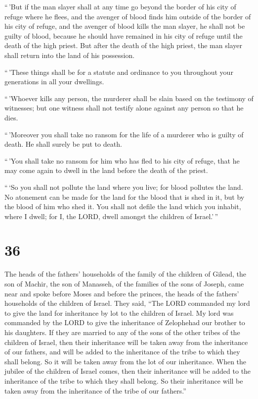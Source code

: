  ``\,'But if the man slayer shall at any time go beyond
the border of his city of refuge where he flees,  and the
avenger of blood finds him outside of the border of his city of refuge,
and the avenger of blood kills the man slayer, he shall not be guilty of
blood,  because he should have remained in his city of
refuge until the death of the high priest. But after the death of the
high priest, the man slayer shall return into the land of his
possession.

 ``\,'These things shall be for a statute and ordinance
to you throughout your generations in all your dwellings.

 ``\,'Whoever kills any person, the murderer shall be
slain based on the testimony of witnesses; but one witness shall not
testify alone against any person so that he dies.

 ``\,'Moreover you shall take no ransom for the life of a
murderer who is guilty of death. He shall surely be put to death.

 ``\,'You shall take no ransom for him who has fled to
his city of refuge, that he may come again to dwell in the land before
the death of the priest.

 ``\,`So you shall not pollute the land where you live;
for blood pollutes the land. No atonement can be made for the land for
the blood that is shed in it, but by the blood of him who shed it.
 You shall not defile the land which you inhabit, where I
dwell; for I, the LORD, dwell amongst the children of Israel.'\,''

\hypertarget{section-35}{%
\section{36}\label{section-35}}

 The heads of the fathers' households of the family of the
children of Gilead, the son of Machir, the son of Manasseh, of the
families of the sons of Joseph, came near and spoke before Moses and
before the princes, the heads of the fathers' households of the children
of Israel.  They said, ``The LORD commanded my lord to
give the land for inheritance by lot to the children of Israel. My lord
was commanded by the LORD to give the inheritance of Zelophehad our
brother to his daughters.  If they are married to any of
the sons of the other tribes of the children of Israel, then their
inheritance will be taken away from the inheritance of our fathers, and
will be added to the inheritance of the tribe to which they shall
belong. So it will be taken away from the lot of our inheritance.
 When the jubilee of the children of Israel comes, then
their inheritance will be added to the inheritance of the tribe to which
they shall belong. So their inheritance will be taken away from the
inheritance of the tribe of our fathers.''

